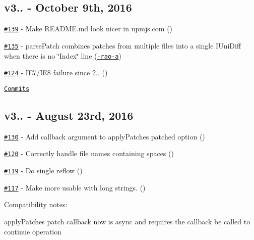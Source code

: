 \subsection*{v3.. -\/ October 9th, 2016}


\begin{DoxyItemize}
\item \href{https://github.com/kpdecker/jsdiff/pull/139}{\tt \#139} -\/ Make R\+E\+A\+D\+M\+E.\+md look nicer in npmjs.\+com (\href{https://api.github.com/users/takenspc}{\tt })
\item \href{https://github.com/kpdecker/jsdiff/issues/135}{\tt \#135} -\/ parse\+Patch combines patches from multiple files into a single I\+Uni\+Diff when there is no \char`\"{}\+Index\char`\"{} line (\href{https://api.github.com/users/ramya-rao-a}{\tt -\/rao-\/a})
\item \href{https://github.com/kpdecker/jsdiff/issues/124}{\tt \#124} -\/ I\+E7/\+I\+E8 failure since 2.. (\href{https://api.github.com/users/boneskull}{\tt })
\end{DoxyItemize}

\href{https://github.com/kpdecker/jsdiff/compare/v3.0.0...v3.0.1}{\tt Commits}

\subsection*{v3.. -\/ August 23rd, 2016}


\begin{DoxyItemize}
\item \href{https://github.com/kpdecker/jsdiff/pull/130}{\tt \#130} -\/ Add callback argument to apply\+Patches {\ttfamily patched} option (\href{https://api.github.com/users/piranna}{\tt })
\item \href{https://github.com/kpdecker/jsdiff/pull/120}{\tt \#120} -\/ Correctly handle file names containing spaces (\href{https://api.github.com/users/adius}{\tt })
\item \href{https://github.com/kpdecker/jsdiff/pull/119}{\tt \#119} -\/ Do single reflow (\href{https://api.github.com/users/wifiextender}{\tt })
\item \href{https://github.com/kpdecker/jsdiff/pull/117}{\tt \#117} -\/ Make more usable with long strings. (\href{https://api.github.com/users/abnbgist}{\tt })
\end{DoxyItemize}

Compatibility notes\+:
\begin{DoxyItemize}
\item apply\+Patches patch callback now is async and requires the callback be called to continue operation
\end{DoxyItemize}

